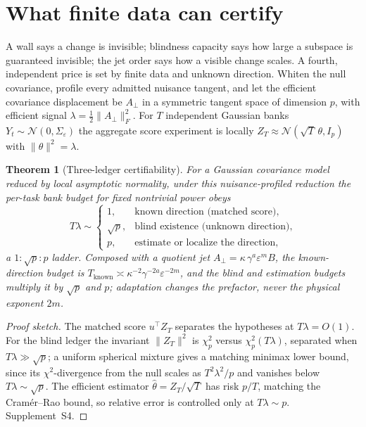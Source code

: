 \documentclass[10pt,twocolumn]{article}
\theoremstyle{plain}
\newtheorem{theorem}{Theorem}
\theoremstyle{definition}
\newcommand{\eps}{\varepsilon}
\begin{document}
\section{What finite data can certify}\label{sec:certify}
A wall says a change is invisible; blindness capacity says how large a subspace is
guaranteed invisible; the jet order says how a visible change scales. A fourth,
independent price is set by finite data and unknown direction. Whiten the null
covariance, profile every admitted nuisance tangent, and let the efficient
covariance displacement be $A_\perp$ in a symmetric tangent space of dimension $p$,
with efficient signal $\lambda=\tfrac12\lVert A_\perp\rVert_F^2$. For $T$
independent Gaussian banks $Y_t\sim\mathcal N(0,\Sigma_\eps)$ the aggregate score
experiment is locally $Z_T\approx\mathcal N(\sqrt T\,\theta,I_p)$ with
$\lVert\theta\rVert^2=\lambda$.

\begin{theorem}[Three-ledger certifiability]\label{thm:ledger}
For a Gaussian covariance model reduced by local asymptotic normality, under this
nuisance-profiled reduction the per-task bank budget for fixed nontrivial power obeys
\begin{equation}
T\lambda\sim
\begin{cases}
1, & \text{known direction (matched score),}\\
\sqrt{p}, & \text{blind existence (unknown direction),}\\
p, & \text{estimate or localize the direction,}
\end{cases}
\label{eq:ledgers}
\end{equation}
a $1:\sqrt{p}:p$ ladder. Composed with a quotient jet
$A_\perp=\kappa\,\gamma^{a}\eps^{m}B$, the known-direction budget is
$T_{\mathrm{known}}\asymp\kappa^{-2}\gamma^{-2a}\eps^{-2m}$, and the blind and
estimation budgets multiply it by $\sqrt p$ and $p$; adaptation changes the
prefactor, never the physical exponent $2m$.
\end{theorem}

\begin{proof}[Proof sketch]
The matched score $u^\top Z_T$ separates the hypotheses at $T\lambda=O(1)$. For the
blind ledger the invariant $\lVert Z_T\rVert^2$ is $\chi^2_p$ versus
$\chi^2_p(T\lambda)$, separated when $T\lambda\gg\sqrt p$; a uniform spherical
mixture gives a matching minimax lower bound, since its $\chi^2$-divergence from the
null scales as $T^2\lambda^2/p$ and vanishes below $T\lambda\sim\sqrt p$. The
efficient estimator $\hat\theta=Z_T/\sqrt T$ has risk $p/T$, matching the
Cram\'er--Rao bound, so relative error is controlled only at $T\lambda\sim p$.
Supplement~S4.
\end{proof}
\end{document}
